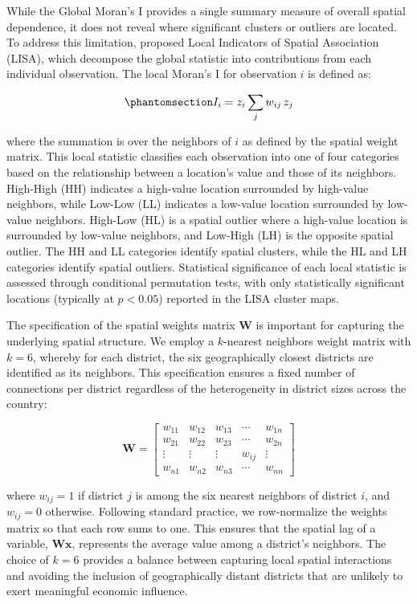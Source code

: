 \documentclass[
  a4paper, 
  twoside,
  review
]{article}
\begin{document}
While the Global Moran's I provides a single summary measure of overall
spatial dependence, it does not reveal where significant clusters or
outliers are located. To address this limitation, \citet{anselin_lisa}
proposed Local Indicators of Spatial Association (LISA), which decompose
the global statistic into contributions from each individual
observation. The local Moran's I for observation \(i\) is defined as:

\begin{equation}\phantomsection\label{eq-lisa}{
I_i = z_i \sum_j w_{ij} \, z_j
}\end{equation}

where the summation is over the neighbors of \(i\) as defined by the
spatial weight matrix. This local statistic classifies each observation
into one of four categories based on the relationship between a
location's value and those of its neighbors. High-High (HH) indicates a
high-value location surrounded by high-value neighbors, while Low-Low
(LL) indicates a low-value location surrounded by low-value neighbors.
High-Low (HL) is a spatial outlier where a high-value location is
surrounded by low-value neighbors, and Low-High (LH) is the opposite
spatial outlier. The HH and LL categories identify spatial clusters,
while the HL and LH categories identify spatial outliers. Statistical
significance of each local statistic is assessed through conditional
permutation tests, with only statistically significant locations
(typically at \(p < 0.05\)) reported in the LISA cluster maps.

The specification of the spatial weights matrix \(\mathbf{W}\) is
important for capturing the underlying spatial structure. We employ a
\(k\)-nearest neighbors weight matrix with \(k = 6\), whereby for each
district, the six geographically closest districts are identified as its
neighbors. This specification ensures a fixed number of connections per
district regardless of the heterogeneity in district sizes across the
country:

\[
\mathbf{W}=\left[\begin{array}{ccccc}
w_{11} & w_{12} & w_{13} & \cdots & w_{1n} \\
w_{21} & w_{22} & w_{23} & \cdots & w_{2n} \\
\vdots & \vdots & \vdots & w_{ij} & \vdots \\
w_{n1} & w_{n2} & w_{n3} & \cdots & w_{nn}
\end{array}\right]
\]

where \(w_{ij} = 1\) if district \(j\) is among the six nearest
neighbors of district \(i\), and \(w_{ij} = 0\) otherwise. Following
standard practice, we row-normalize the weights matrix so that each row
sums to one. This ensures that the spatial lag of a variable,
\(\mathbf{W} \mathbf{x}\), represents the average value among a
district's neighbors. The choice of \(k = 6\) provides a balance between
capturing local spatial interactions and avoiding the inclusion of
geographically distant districts that are unlikely to exert meaningful
economic influence.
\end{document}
